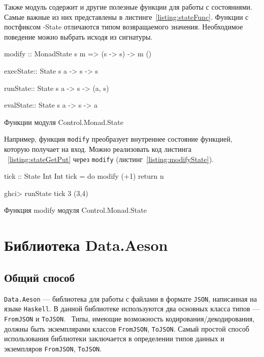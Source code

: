 Также модуль содержит и другие полезные функции для работы с состояниями. Самые важные из них представлены в листинге~\ref{listing:stateFunc}. Функции с постфиксом -State отличаются типом возвращаемого значения. Необходимое поведение можно выбрать исходя из сигнатуры.

\begin{ListingEnv}[H]
\begin{Verb}
modify :: MonadState s m => (s -> s) -> m ()

execState:: State s a -> s -> s

runState:: State s a -> s -> (a, s)

evalState:: State s a -> s -> a
\end{Verb}
\caption{Функции модуля Control.Monad.State}
\label{listing:stateFunc}
\end{ListingEnv}

Например, функция \lstinline{modify} преобразует внутреннее состояние функцией, которую получает на вход. Можно реализовать код листинга ~\ref{listing:stateGetPut} через \lstinline{modify} (листинг~\ref{listing:modifyState}).

\begin{ListingEnv}[H]
\begin{Verb}
tick :: State Int Int
tick = do modify (+1)
          return n

ghci> runState tick 3
(3,4)
\end{Verb}
\caption{Функция modify модуля Control.Monad.State}
\label{listing:modifyState}
\end{ListingEnv}
	
\section{Библиотека Data.Aeson}
\label{sec:secAeson}

\subsection{Общий способ}

\lstinline{Data.Aeson} --- библиотека для работы с файлами в формате \lstinline{JSON}, написанная на языке \lstinline{Haskell}. В данной  библиотеке используются два основных класса типов --- \lstinline{FromJSON} и \lstinline{ToJSON}.~\cite{aesonEx} Типы, имеющие возможность кодирования/декодирования, должны быть экземплярами классов \lstinline{FromJSON}, \lstinline{ToJSON}. Самый простой способ использования библиотеки заключается в определении типов данных и экземпляров \lstinline{FromJSON}, \lstinline{ToJSON}. 


